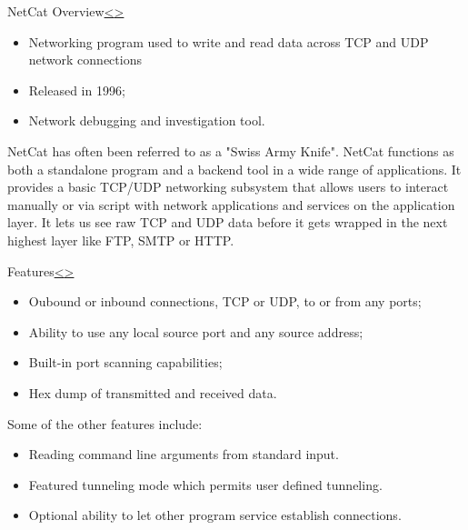 \documentclass[12pt]{article}
\newenvironment{instructionblock}{\Large\bgroup}{\egroup}
\begin{document}
\pagebreak
\begin{slide}{NetCat Overview}{\hyperref[slide 17]{\textless}\hyperref[slide 19]{\textgreater}}
\vskip 5pt
\begin{instructionblock}
\begin{itemize}
   \item Networking program used to write and read data across TCP and UDP network connections
   \item Released in 1996;
   \item Network debugging and investigation tool.
\end{itemize}
\end{instructionblock}
\end{slide}
NetCat has often been referred to as a "Swiss Army Knife". NetCat functions as both a standalone program and a backend tool in a wide range of applications. It provides a basic TCP/UDP networking subsystem that allows users to interact manually or via script with network applications and services on the application layer. It lets us see raw TCP and UDP data before it gets wrapped in the next highest layer like FTP, SMTP or HTTP.\cite{Inetcat} 
\pagebreak
\begin{slide}{Features}{\hyperref[slide 18]{\textless}\hyperref[slide 20]{\textgreater}}
\vskip 5pt
\begin{instructionblock}
\begin{itemize}
\item Oubound or inbound connections, TCP or UDP, to or from any ports;
\item Ability to use any local source port and any source address;
\item Built-in port scanning capabilities;
\item Hex dump of transmitted and received data.
\end{itemize}
\end{instructionblock}
\end{slide}


Some of the other features include: 
\begin{itemize}
\item Reading command line arguments from standard input.
\item Featured tunneling mode which permits user defined tunneling.
\item Optional ability to let other program service establish connections.\cite{Inetcat} 

\end{itemize}
\end{document}
